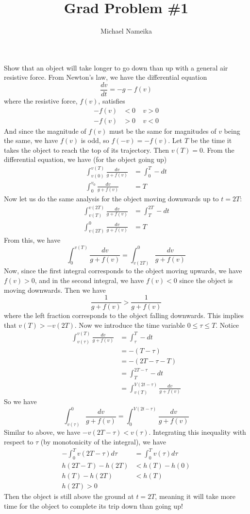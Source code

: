 \documentclass{article}
\title{Grad Problem \#1}
\author{Michael Nameika}
\date{}
\begin{document}
\maketitle
Show that an object will take longer to go down than up with a general air resistive force.
\newline\newline
From Newton's law, we have the differential equation
\[\frac{dv}{dt} = -g - f(v)\]
where the resistive force, $f(v)$, satisfies
\begin{align*}
    -f(v) &< 0 \;\;\;\; v > 0\\
    -f(v) &>0 \;\;\;\; v < 0
\end{align*}
And since the magnitude of $f(v)$ must be the same for magnitudes of $v$ being the same, we have $f(v)$ is odd, so $f(-v) = -f(v)$. Let $T$ be the time it takes the object to reach the top of its trajectory. Then $v(T) = 0$. From the differential equation, we have (for the object going up)
\begin{align*}
    \int_{v(0)}^{v(T)}\frac{dv}{g + f(v)} &= \int_0^T -dt \\
    \int_{0}^{v_0}\frac{dv}{g + f(v)} &= T
\end{align*}
Now let us do the same analysis for the object moving downwards up to $t = 2T$:
\begin{align*}
    \int_{v(T)}^{v(2T)}\frac{dv}{g + f(v)} &= \int_T^{2T}-dt \\
    \int_{v(2T)}^0 \frac{dv}{g + f(v)} &= T
\end{align*}
From this, we have
\[\int_0^{v(T)} \frac{dv}{g + f(v)} = \int_{v(2T)}^0 \frac{dv}{g + f(v)}\]
Now, since the first integral corresponds to the object moving upwards, we have $f(v) > 0 $, and in the second integral, we have $f(v) < 0$ since the object is moving downwards. Then we have
\[\frac{1}{g + f(v)} > \frac{1}{g + f(v)}\]
where the left fraction corresponds to the object falling downwards. This implies that $v(T) > -v(2T)$. Now we introduce the time variable $0 \leq \tau \leq T$. Notice
\begin{align*}
    \int_{v(\tau)}^{v(T)}\frac{dv}{g + f(v)} &= \int_{\tau}^T-dt \\
    &= -(T- \tau) \\
    &= -(2T - \tau - T) \\
    &= \int_{T}^{2T -\tau}-dt \\
    &= \int_{v(T)}^{V(2t - \tau)}\frac{dv}{g + f(v)} 
\end{align*}
So we have
\[\int_{v(\tau)}^{0}\frac{dv}{g + f(v)} = \int_{0}^{V(2t - \tau)}\frac{dv}{g + f(v)} \]
Similar to above, we have $-v(2T - \tau) < v(\tau)$. Integrating this inequality with respect to $\tau$ (by monotonicity of the integral), we have
\begin{align*}
    -\int_0^Tv(2T - \tau)d\tau &= \int_0^Tv(\tau)d\tau \\
    h(2T-T) - h(2T)  &< h(T) - h(0) \\
    h(T) - h(2T) &< h(T) \\
    h(2T) > 0 
\end{align*}
Then the object is still above the ground at $t = 2T$, meaning it will take more time for the object to complete its trip down than going up!
\end{document}
